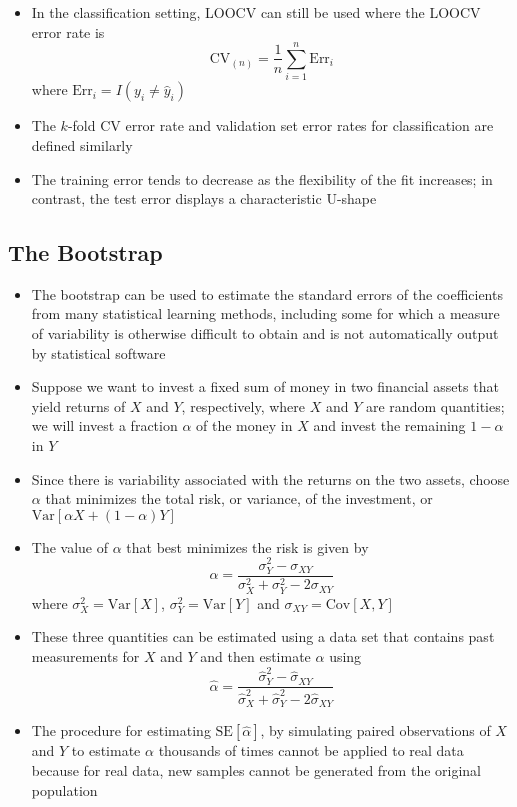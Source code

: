 \documentclass[12pt]{article}
\begin{document}
\begin{itemize}
\item In the classification setting, LOOCV can still be used where the LOOCV error rate is $$ \text{CV}_{(n)} = \frac{1}{n}\sum_{i=1}^n \text{Err}_i$$ where $\text{Err}_i = I(y_i \neq \hat{y}_i)$
\item The $k$-fold CV error rate and validation set error rates for classification are defined similarly 
\item The training error tends to decrease as the flexibility of the fit increases; in contrast, the test error displays a characteristic U-shape 
\end{itemize}
\subsection{The Bootstrap}
\begin{itemize} 
\item The bootstrap can be used to estimate the standard errors of the coefficients from many statistical learning methods, including some for which a measure of variability is otherwise difficult to obtain and is not automatically output by statistical software 
\item Suppose we want to invest a fixed sum of money in two financial assets that yield returns of $X$ and $Y$, respectively, where $X$ and $Y$ are random quantities; we will invest a fraction $\alpha$ of the money in $X$ and invest the remaining $1-\alpha$ in $Y$ 
\item Since there is variability associated with the returns on the two assets, choose $\alpha$ that minimizes the total risk, or variance, of the investment, or $\text{Var}[\alpha X + (1-\alpha)Y]$
\item The value of $\alpha$ that best minimizes the risk is given by $$ \alpha = \frac{\sigma^2_Y - \sigma_{XY}}{\sigma^2_X + \sigma^2_Y - 2\sigma_{XY}}$$ where $\sigma^2_X = \text{Var}[X]$, $\sigma^2_Y = \text{Var}[Y]$ and $\sigma_{XY} = \text{Cov}[X,Y]$ 
\item These three quantities can be estimated using a data set that contains past measurements for $X$ and $Y$ and then estimate $\alpha$ using 
$$ \hat{\alpha} = \frac{\hat{\sigma}^2_Y - \hat{\sigma}_{XY}}{\hat{\sigma}^2_X + \hat{\sigma}^2_Y - 2\hat{\sigma}_{XY}} $$ 
\item The procedure for estimating $\text{SE}[\hat{\alpha}]$, by simulating paired observations of $X$ and $Y$ to estimate $\alpha$ thousands of times cannot be applied to real data because for real data, new samples cannot be generated from the original population

\end{itemize}
\end{document}
